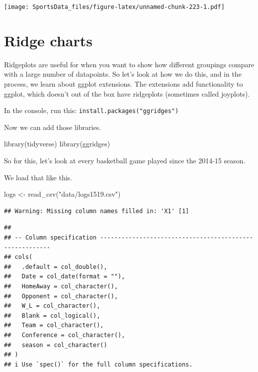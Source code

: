\documentclass[
]{book}
\newenvironment{Shaded}{\begin{snugshade}}{\end{snugshade}}
\newcommand{\FunctionTok}[1]{\textcolor[rgb]{0.00,0.00,0.00}{#1}}
\newcommand{\NormalTok}[1]{#1}
\newcommand{\OtherTok}[1]{\textcolor[rgb]{0.56,0.35,0.01}{#1}}
\newcommand{\StringTok}[1]{\textcolor[rgb]{0.31,0.60,0.02}{#1}}
\begin{document}
\texttt{[image: SportsData\_files/figure-latex/unnamed-chunk-223-1.pdf]}

\hypertarget{ridge-charts}{%
\chapter{Ridge charts}\label{ridge-charts}}

Ridgeplots are useful for when you want to show how different groupings compare with a large number of datapoints. So let's look at how we do this, and in the process, we learn about ggplot extensions. The extensions add functionality to ggplot, which doesn't out of the box have ridgeplots (sometimes called joyplots).

In the console, run this: \texttt{install.packages("ggridges")}

Now we can add those libraries.

\begin{Shaded}
\begin{Highlighting}[]
\FunctionTok{library}\NormalTok{(tidyverse)}
\FunctionTok{library}\NormalTok{(ggridges)}
\end{Highlighting}
\end{Shaded}

So for this, let's look at every basketball game played since the 2014-15 season.

We load that like this.

\begin{Shaded}
\begin{Highlighting}[]
\NormalTok{logs }\OtherTok{\textless{}{-}} \FunctionTok{read\_csv}\NormalTok{(}\StringTok{"data/logs1519.csv"}\NormalTok{)}
\end{Highlighting}
\end{Shaded}

\begin{verbatim}
## Warning: Missing column names filled in: 'X1' [1]
\end{verbatim}

\begin{verbatim}
## 
## -- Column specification --------------------------------------------------------
## cols(
##   .default = col_double(),
##   Date = col_date(format = ""),
##   HomeAway = col_character(),
##   Opponent = col_character(),
##   W_L = col_character(),
##   Blank = col_logical(),
##   Team = col_character(),
##   Conference = col_character(),
##   season = col_character()
## )
## i Use `spec()` for the full column specifications.
\end{verbatim}
\end{document}
